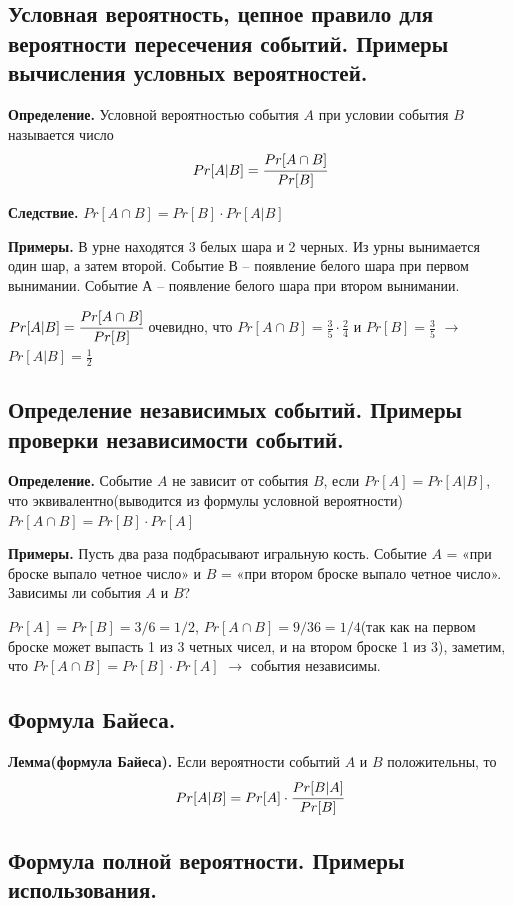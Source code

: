 \documentclass[a4paper, 10pt]{article}
\begin{document}
\subsection{Условная вероятность, цепное правило для вероятности пересечения событий. Примеры вычисления условных вероятностей.}

\textbf{Определение.} Условной вероятностью события $A$ при условии события $B$ называется число $$Pr[A|B] = \cfrac{Pr[A \cap B]}{Pr[B]}$$

\textbf{Следствие.} $Pr[A \cap B] = Pr[B] \cdot Pr[A|B]$

\textbf{Примеры.}  В урне находятся 3 белых шара и 2 черных. Из урны вынимается один шар, а затем второй. Событие В – появление белого шара при первом вынимании. Событие А – появление белого шара при втором вынимании.

$Pr[A|B] = \cfrac{Pr[A \cap B]}{Pr[B]}$ очевидно, что $Pr[A \cap B] = \frac{3}{5} \cdot \frac{2}{4}$ и $Pr[B] = \frac{3}{5}$ $\to$ $Pr[A|B] = \frac{1}{2}$

\subsection{Определение независимых событий. Примеры проверки независимости событий.}

\textbf{Определение.} Событие $A$ не зависит от события $B$, если $Pr[A] = Pr[A|B]$, что эквивалентно(выводится из формулы условной вероятности) $Pr[A \cap B] = Pr[B] \cdot Pr[A]$

\textbf{Примеры.} Пусть два раза подбрасывают игральную кость. Событие $A$ = «при броске выпало четное число» и $B$ = «при втором броске выпало четное число». Зависимы ли события $A$ и $B$?

$Pr[A] = Pr[B] = 3/6 = 1/2$, $Pr[A \cap B] = 9/36 = 1/4$(так как на первом броске может выпасть 1 из 3 четных чисел, и на втором броске 1 из 3), заметим, что $Pr[A \cap B] = Pr[B] \cdot Pr[A]$ $\to$ события независимы.

\subsection{Формула Байеса.}

\textbf{Лемма(формула Байеса).} Если вероятности событий $A$ и $B$ положительны, то $$Pr[A|B] = Pr[A] \cdot \cfrac{Pr[B|A]}{Pr[B]}$$

\subsection{Формула полной вероятности. Примеры использования.}
\end{document}
